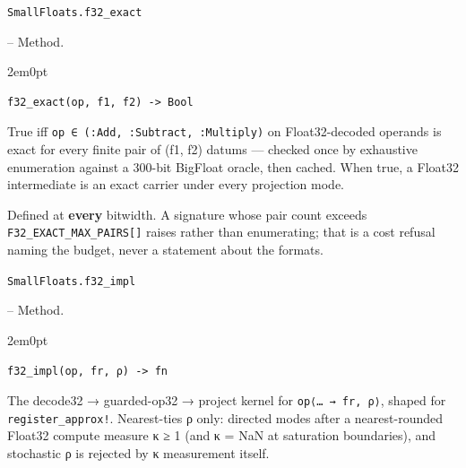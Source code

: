 \par\medskip\noindent\begin{minipage}{\linewidth}
\hypertarget{13855860993665101274}{\texttt{SmallFloats.f32\_\allowbreak{}exact}}  -- {Method.}
\nopagebreak
\begin{adjustwidth}{2em}{0pt}


\begin{verbatim}
f32_exact(op, f1, f2) -> Bool
\end{verbatim}

True iff \texttt{op ∈ (\allowbreak{}:Add, :Subtract, :Multiply)} on Float32-decoded operands is exact for every finite pair of (f1, f2) datums — checked once by exhaustive enumeration against a 300-bit BigFloat oracle, then cached. When true, a Float32 intermediate is an exact carrier under every projection mode.

Defined at \textbf{every} bitwidth. A signature whose pair count exceeds \texttt{F32\_\allowbreak{}EXACT\_\allowbreak{}MAX\_\allowbreak{}PAIRS[]} raises rather than enumerating; that is a cost refusal naming the budget, never a statement about the formats.



\end{adjustwidth}
\end{minipage}
\par\medskip

\par\medskip\noindent\begin{minipage}{\linewidth}
\hypertarget{12747529899584332009}{\texttt{SmallFloats.f32\_\allowbreak{}impl}}  -- {Method.}
\nopagebreak
\begin{adjustwidth}{2em}{0pt}


\begin{verbatim}
f32_impl(op, fr, ρ) -> fn
\end{verbatim}

The decode32 → guarded-op32 → project kernel for \texttt{op⟨… → fr, ρ⟩}, shaped for \texttt{register\_\allowbreak{}approx!}. Nearest-ties ρ only: directed modes after a nearest-rounded Float32 compute measure κ ≥ 1 (and κ = NaN at saturation boundaries), and stochastic ρ is rejected by κ measurement itself.



\end{adjustwidth}
\end{minipage}
\par\medskip

